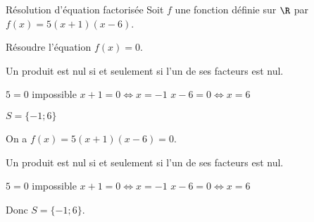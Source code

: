\begin{EXO}{Résolution d'équation factorisée}{}
Soit $f$ une fonction définie sur $\R$ par $f(x) = 5(x+1)(x-6)$. 

 Résoudre l'équation $f(x)=0$.

\begin{crep}
Un produit est nul si et seulement si l'un de ses facteurs est nul.

\begin{tcbenumerate}[3]
\tcbitem $5 = 0$ impossible
\tcbitem $x+1 = 0 \Leftrightarrow x = -1$
\tcbitem $x-6 = 0 \Leftrightarrow x = 6$
\end{tcbenumerate}
$S = \{-1 ; 6\}$
\end{crep}

\exocorrection

On a $f(x) = 5(x+1)(x-6) = 0$.

Un produit est nul si et seulement si l'un de ses facteurs est nul.

\begin{tcbenumerate}[3]
\tcbitem $5 = 0$ impossible
\tcbitem $x+1 = 0 \Leftrightarrow x = -1$
\tcbitem $x-6 = 0 \Leftrightarrow x = 6$
\end{tcbenumerate}

Donc $S = \{-1 ; 6\}$.
\end{EXO}